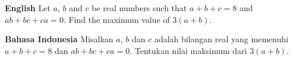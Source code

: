 \textbf{English}
Let $a$, $b$ and $c$ be real numbers such that $a + b + c = 8$ and $ab + bc + ca = 0$.
Find the maximum value of $3(a + b)$.

\textbf{Bahasa Indonesia}
Misalkan $a$, $b$ dan $c$ adalah bilangan real yang memenuhi $a + b + c = 8$ dan $ab + bc + ca = 0$.
Tentukan nilai maksimum dari $3(a + b)$.

